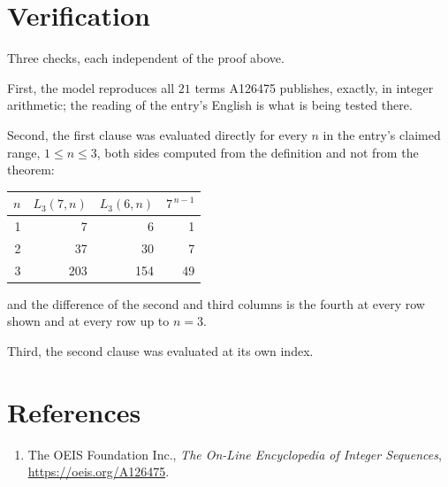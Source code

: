 \documentclass[11pt,a4paper]{article}
\theoremstyle{plain}
\theoremstyle{definition}
\begin{document}
\section{Verification}

Three checks, each independent of the proof above.

First, the model reproduces all $21$ terms A126475 publishes, exactly, in integer
arithmetic; the reading of the entry's English is what is being tested there.

Second, the first clause was evaluated directly for every $n$ in the entry's claimed range,
$1\le n\le3$, both sides computed from the definition and not from the theorem:

\begin{center}
\begin{tabular}{rrrr}
$n$ & $L_{3}(7,n)$ & $L_{3}(6,n)$ & $7^{\,n-1}$ \\ \hline
1 & 7 & 6 & 1 \\
2 & 37 & 30 & 7 \\
3 & 203 & 154 & 49 \\
\end{tabular}
\end{center}

\noindent and the difference of the second and third columns is the fourth at every row shown
and at every row up to $n=3$.

Third, the second clause was evaluated at its own index.

\section*{References}
\begin{enumerate}
\item The OEIS Foundation Inc., \emph{The On-Line Encyclopedia of Integer Sequences},
\url{https://oeis.org/A126475}.
\end{enumerate}
\end{document}
